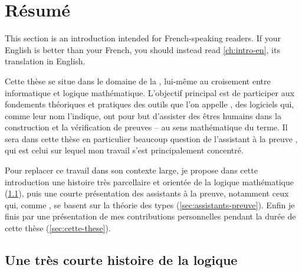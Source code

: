 \chapter{Résumé}
\label{ch:intro-fr}

\begin{kaobox}[backgroundcolor=Black!10!White,frametitlebackgroundcolor=Black!10!White]
  This section is an introduction intended for French-speaking readers.
  If your English is better than your French,
  you should instead read \cref{ch:intro-en}, its translation in English.
\end{kaobox}

Cette thèse se situe dans le domaine de la , lui-même au croisement entre informatique et logique mathématique.
L’objectif principal est de participer aux fondements théoriques et pratiques des outils
que l’on appelle , des logiciels qui, comme leur nom
l’indique, ont pour but d’assister des êtres humains dans la construction
et la vérification de preuves – au sens mathématique du terme. Il sera dans cette thèse
en particulier beaucoup question de l’assistant à la preuve , qui est celui
sur lequel mon travail s’est principalement concentré.

Pour replacer ce travail dans son contexte large, je propose dans cette introduction une histoire très parcellaire et orientée de la logique mathématique
(\cref{sec:logique-histoire}), puis une courte présentation des assistants à la preuve,
notamment ceux qui, comme , se basent sur la théorie des types (\cref{sec:assistants-preuve}). Enfin je finis par une présentation de mes contributions
personnelles pendant la durée de cette thèse (\cref{sec:cette-these}).

\section{Une très courte histoire de la logique}
\label{sec:logique-histoire}

